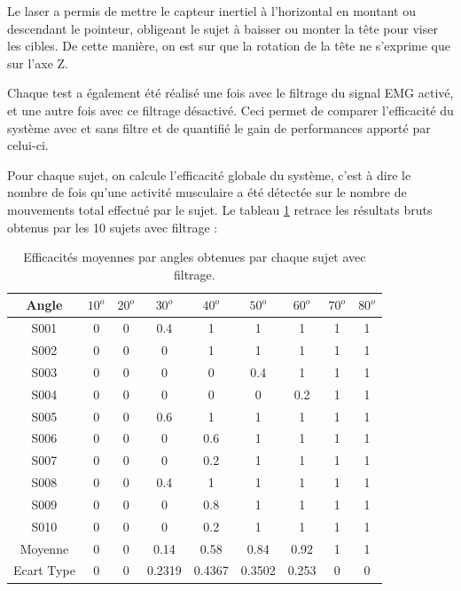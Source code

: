 \documentclass[letterpaper, twoside, 12pt, memoire, creativecommons, hyperref]{thETS}
\begin{document}
Le laser a permis de mettre le capteur inertiel à l'horizontal en montant ou descendant le pointeur, obligeant le sujet à baisser ou monter la tête pour viser les cibles. De cette manière, on est sur que la rotation de la tête ne s'exprime que sur l'axe Z.

Chaque test a également été réalisé une fois avec le filtrage du signal EMG activé, et une autre fois avec ce filtrage désactivé. Ceci permet de comparer l'efficacité du système avec et sans filtre et de quantifié le gain de performances apporté par celui-ci.

Pour chaque sujet, on calcule l'efficacité globale du système, c'est à dire le nombre de fois qu'une activité musculaire a été détectée sur le nombre de mouvements total effectué par le sujet. Le tableau \ref{tab:effangles} retrace les résultats bruts obtenus par les 10 sujets avec filtrage : 

\begin{table}[ht]
	\caption{Efficacités moyennes par angles obtenues par chaque sujet avec filtrage. }
		\begin{tabular}{|c|c|c|c|c|c|c|c|c|}
		\hline
			Angle & $10^{o}$ & $20^{o}$ & $30^{o}$ & $40^{o}$ & $50^{o}$ & $60^{o}$ & $70^{o}$ & $80^{o}$\\
	    \hline
	    		S001 & 0 & 0 & 0.4 & 1 & 1 & 1 & 1 & 1\\
	    \hline
			S002 & 0 & 0 & 0 & 1 & 1 & 1 & 1 & 1\\
	    \hline
	    		S003 & 0 & 0 & 0 & 0 & 0.4 & 1 & 1 & 1\\
	    \hline
	    		S004 & 0 & 0 & 0 & 0 & 0 & 0.2 & 1 & 1\\
	    \hline
	    		S005 & 0 & 0 & 0.6 & 1 & 1 & 1 & 1 & 1\\
	    \hline
	    		S006 & 0 & 0 & 0 & 0.6 & 1 & 1 & 1 & 1\\
	    \hline
	    		S007 & 0 & 0 & 0 & 0.2 & 1 & 1 & 1 & 1\\
	    \hline
	    		S008 & 0 & 0 & 0.4 & 1 & 1 & 1 & 1 & 1\\
	    \hline
	    		S009 & 0 & 0 & 0 & 0.8 & 1 & 1 & 1 & 1\\
	    \hline
	    		S010 & 0 & 0 & 0 & 0.2 & 1 & 1 & 1 & 1\\
	    \hline
	    		Moyenne & 0 & 0 & 0.14 & 0.58 & 0.84 & 0.92 & 1 & 1\\
	    \hline
	    		Ecart Type & 0 & 0 & 0.2319 & 0.4367 & 0.3502 & 0.253 & 0 & 0\\
	    \hline
		\end{tabular}
	\label{tab:effangles}
\end{table}
\end{document}
